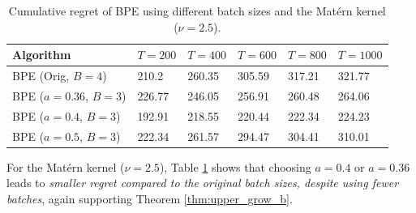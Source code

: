 \documentclass[10pt]{article}
\begin{document}
\begin{table}[h!]
\caption{Cumulative regret of BPE using different batch sizes and the Mat\'ern kernel ($\nu=2.5$).} \label{tab:mat_2.5}
\begin{center}
\begin{tabular}{llllll}
\toprule
Algorithm  & $T=200$ & $T=400$ & $T=600$ & $T=800$ & $T=1000$ \\
\midrule
BPE (Orig, $B=4$)     & 210.2  & 260.35 & 305.59 & 317.21 & 321.77 \\
BPE ($a=0.36$, $B=3$) & 226.77 & 246.05 & 256.91 & 260.48 & 264.06 \\
BPE ($a=0.4$, $B=3$)  & 192.91 & 218.55 & 220.44 & 222.34 & 224.23 \\
BPE ($a=0.5$, $B=3$)  & 222.34 & 261.57 & 294.47 & 304.41 & 310.01 \\
\bottomrule
\end{tabular}
\end{center}
\end{table}

For the Mat\'ern kernel ($\nu=2.5$), Table \ref{tab:mat_2.5} shows that choosing $a=0.4$ or $a=0.36$ leads to \emph{smaller regret compared to the original batch sizes, despite using fewer batches}, again supporting Theorem \ref{thm:upper_grow_b}.
\end{document}
